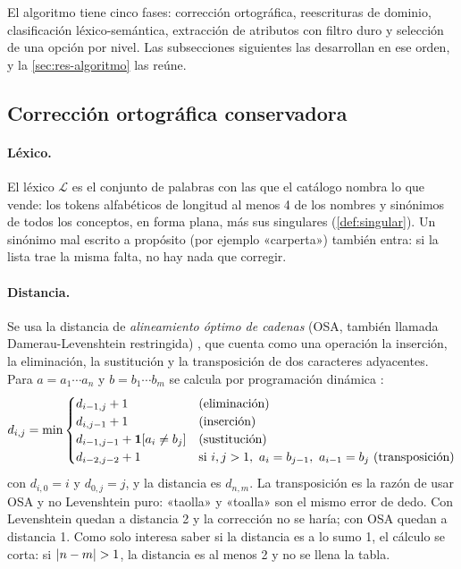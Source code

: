 El algoritmo tiene cinco fases: corrección ortográfica, reescrituras de
dominio, clasificación léxico-semántica, extracción de atributos con filtro
duro y selección de una opción por nivel. Las subsecciones siguientes las
desarrollan en ese orden, y la \cref{sec:res-algoritmo} las reúne.

\subsection{Corrección ortográfica conservadora}
\label{sec:res-ortografia}

\paragraph{Léxico.} El léxico $\mathcal{L}$ es el conjunto de palabras con las
que el catálogo nombra lo que vende: los tokens alfabéticos de longitud al
menos 4 de los nombres y sinónimos de todos los conceptos, en forma plana, más
sus singulares (\cref{def:singular}). Un sinónimo mal escrito a propósito
(por ejemplo «carperta») también entra: si la lista trae la misma falta, no hay
nada que corregir.

\paragraph{Distancia.} Se usa la distancia de \emph{alineamiento óptimo de
cadenas} (OSA, también llamada Damerau-Levenshtein restringida)
\cite{damerau1964,levenshtein1966}, que cuenta como una operación la
inserción, la eliminación, la sustitución y la transposición de dos
caracteres adyacentes. Para $a=a_1\cdots a_n$ y $b=b_1\cdots b_m$ se calcula
por programación dinámica \cite{wagner1974}:
\[
  d_{i,j} = \min\begin{cases}
    d_{i-1,j}+1 & \text{(eliminación)}\\
    d_{i,j-1}+1 & \text{(inserción)}\\
    d_{i-1,j-1}+\mathbf{1}\!\left[a_i\neq b_j\right] & \text{(sustitución)}\\
    d_{i-2,j-2}+1 & \text{si } i,j>1,\ a_i=b_{j-1},\ a_{i-1}=b_j \text{ (transposición)}
  \end{cases}
\]
con $d_{i,0}=i$ y $d_{0,j}=j$, y la distancia es $d_{n,m}$. La transposición es
la razón de usar OSA y no Levenshtein puro: «taolla» y «toalla» son el mismo
error de dedo. Con Levenshtein quedan a distancia 2 y la corrección no se
haría; con OSA quedan a distancia 1. Como solo interesa saber si la distancia
es a lo sumo 1, el cálculo se corta: si $\left\lvert n-m \right\rvert>1$, la distancia es al
menos 2 y no se llena la tabla.

